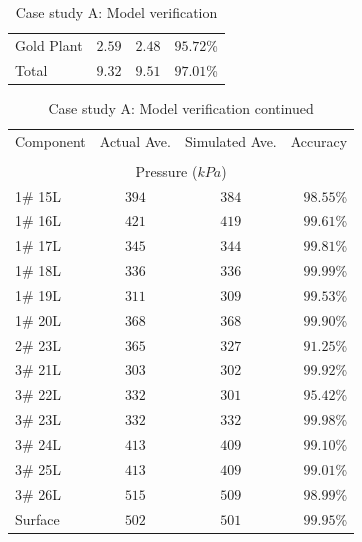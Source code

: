 \begin{appendices}
\begin{table}[h!]
\begin{tabular}{lccr}
		Gold Plant & $ 2.59 $ & $ 2.48 $ & $ 95.72 $\% \\
		Total  	 & $ 9.32$  & $9.51 $  & $ 97.01 $\% \\
		\hline 
	\end{tabular}
		\caption{Case study A: Model verification}
		\label{Table: A verification}
	\end{table}
\begin{table}[h!]
		\centering
		\begin{tabular}{lccr}
			\hline 
			Component & Actual Ave. & Simulated  Ave. & Accuracy \\ \hhline{====} 
			\\
		\multicolumn{4}{c}{Pressure ($ kPa $)}
		\\
		1\# 15L  & $ 394 $ & $ 384 $ & $ 98.55 $\% \\
		1\# 16L  & $ 421 $ & $ 419 $ & $ 99.61 $\% \\
		1\# 17L  & $ 345 $ & $ 344 $ & $ 99.81 $\% \\
		1\# 18L  & $ 336 $ & $ 336 $ & $ 99.99 $\% \\
		1\# 19L  & $ 311 $ & $ 309 $ & $ 99.53 $\% \\
		1\# 20L  & $ 368 $ & $ 368 $ & $ 99.90 $\% \\
		2\# 23L  & $ 365 $ & $ 327 $ & $ 91.25 $\% \\
		3\# 21L  & $ 303 $ & $ 302 $ & $ 99.92 $\% \\
		3\# 22L  & $ 332 $ & $ 301 $ & $ 95.42 $\% \\
		3\# 23L  & $ 332 $ & $ 332 $ & $ 99.98 $\% \\
		3\# 24L  & $ 413 $ & $ 409 $ & $ 99.10 $\% \\
		3\# 25L  & $ 413 $ & $ 409 $ & $ 99.01 $\% \\
		3\# 26L  & $ 515 $ & $ 509 $ & $ 98.99 $\% \\
		Surface & $ 502 $ & $ 501 $ & $ 99.95 $\% \\
		\hline 
	\end{tabular}
\caption{Case study A: Model verification continued}
\label{Table: A verification2}
\end{table}


\end{appendices}
